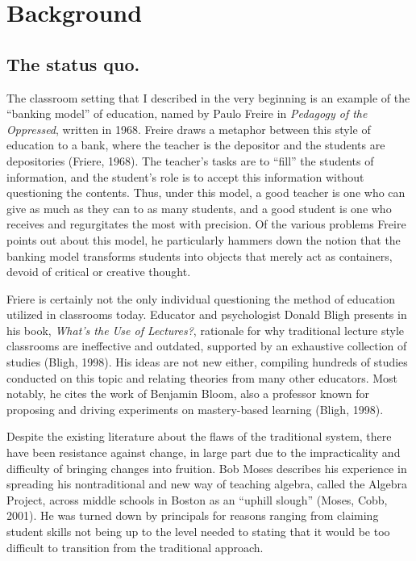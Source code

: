 \section{Background}
\subsection{The status quo.}

The classroom setting that I described in the very beginning is an example of the ``banking model'' of education, named by Paulo Freire in {\it Pedagogy of the Oppressed}, written in 1968. Freire draws a metaphor between this style of education to a bank, where the teacher is the depositor and the students are depositories (Friere, 1968). The teacher's tasks are to ``fill'' the students of information, and the student's role is to accept this information without questioning the contents. Thus, under this model, a good teacher is one who can give as much as they can to as many students, and a good student is one who receives and regurgitates the most with precision. Of the various problems Freire points out about this model, he particularly hammers down the notion that the banking model transforms students into objects that merely act as containers, devoid of critical or creative thought.

Friere is certainly not the only individual questioning the method of education utilized in classrooms today. Educator and psychologist Donald Bligh presents in his book, {\it What's the Use of Lectures?}, rationale for why traditional lecture style classrooms are ineffective and outdated, supported by an exhaustive collection of studies (Bligh, 1998). His ideas are not new either, compiling hundreds of studies conducted on this topic and relating theories from many other educators. Most notably, he cites the work of Benjamin Bloom, also a professor known for proposing and driving experiments on mastery-based learning (Bligh, 1998).

Despite the existing literature about the flaws of the traditional system, there have been resistance against change, in large part due to the impracticality and difficulty of bringing changes into fruition. Bob Moses describes his experience in spreading his nontraditional and new way of teaching algebra, called the Algebra Project, across middle schools in Boston as an ``uphill slough'' (Moses, Cobb, 2001). He was turned down by principals for reasons ranging from claiming student skills not being up to the level needed to stating that it would be too difficult to transition from the traditional approach.

